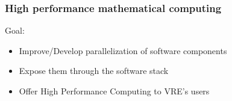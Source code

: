 \documentclass{beamer}
\begin{document}
\begin{frame}
  \frametitle{High performance mathematical computing}
  \begin{block}
    {Goal:}
    \begin{itemize}
    \item Improve/Develop parallelization of software components
    \item Expose them through the software stack
    \item Offer High Performance Computing to VRE's users
    \end{itemize}
  \end{block}



\end{frame}


\end{document}
